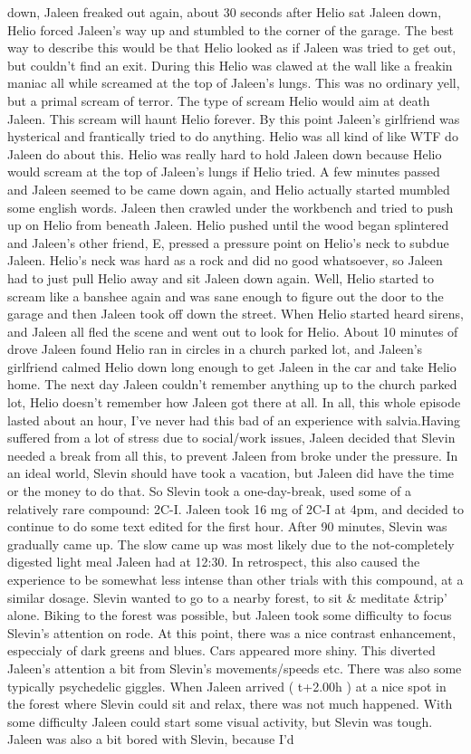 \documentclass[12pt]{book}
\begin{document}
down, Jaleen freaked out again, about 30 seconds after Helio sat Jaleen down, Helio forced Jaleen's way up and stumbled to the corner of the garage. The best way to describe this would be that Helio looked as if Jaleen was tried to get out, but couldn't find an exit. During this Helio was clawed at the wall like a freakin maniac all while screamed at the top of Jaleen's lungs. This was no ordinary yell, but a primal scream of terror. The type of scream Helio would aim at death Jaleen. This scream will haunt Helio forever. By this point Jaleen's girlfriend was hysterical and frantically tried to do anything. Helio was all kind of like WTF do Jaleen do about this. Helio was really hard to hold Jaleen down because Helio would scream at the top of Jaleen's lungs if Helio tried. A few minutes passed and Jaleen seemed to be came down again, and Helio actually started mumbled some english words. Jaleen then crawled under the workbench and tried to push up on Helio from beneath Jaleen. Helio pushed until the wood began splintered and Jaleen's other friend, E, pressed a pressure point on Helio's neck to subdue Jaleen. Helio's neck was hard as a rock and did no good whatsoever, so Jaleen had to just pull Helio away and sit Jaleen down again. Well, Helio started to scream like a banshee again and was sane enough to figure out the door to the garage and then Jaleen took off down the street. When Helio started heard sirens, and Jaleen all fled the scene and went out to look for Helio. About 10 minutes of drove Jaleen found Helio ran in circles in a church parked lot, and Jaleen's girlfriend calmed Helio down long enough to get Jaleen in the car and take Helio home. The next day Jaleen couldn't remember anything up to the church parked lot, Helio doesn't remember how Jaleen got there at all. In all, this whole episode lasted about an hour, I've never had this bad of an experience with salvia.Having suffered from a lot of stress due to social/work issues, Jaleen decided that Slevin needed a break from all this, to prevent Jaleen from broke under the pressure. In an ideal world, Slevin should have took a vacation, but Jaleen did have the time or the money to do that. So Slevin took a one-day-break, used some of a relatively rare compound: 2C-I. Jaleen took 16 mg of 2C-I at 4pm, and decided to continue to do some text edited for the first hour. After 90 minutes, Slevin was gradually came up. The slow came up was most likely due to the not-completely digested light meal Jaleen had at 12:30. In retrospect, this also caused the experience to be somewhat less intense than other trials with this compound, at a similar dosage. Slevin wanted to go to a nearby forest, to sit \& meditate \&trip' alone. Biking to the forest was possible, but Jaleen took some difficulty to focus Slevin's attention on rode. At this point, there was a nice contrast enhancement, especcialy of dark greens and blues. Cars appeared more shiny. This diverted Jaleen's attention a bit from Slevin's movements/speeds etc. There was also some typically psychedelic giggles. When Jaleen arrived ( t+2.00h ) at a nice spot in the forest where Slevin could sit and relax, there was not much happened. With some difficulty Jaleen could start some visual activity, but Slevin was tough. Jaleen was also a bit bored with Slevin, because I'd 
\end{document}

